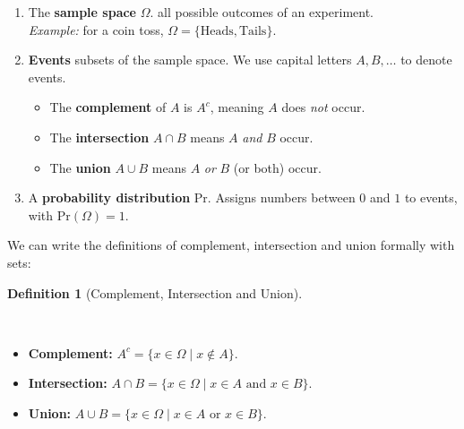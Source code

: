 \documentclass[
  letterpaper,
  DIV=11,
  numbers=noendperiod]{scrreprt}
\providecommand{\tightlist}{%
  \setlength{\itemsep}{0pt}\setlength{\parskip}{0pt}}
\theoremstyle{definition}
\theoremstyle{plain}
\theoremstyle{definition}
\newtheorem{definition}{Definition}[chapter]
\theoremstyle{remark}
\begin{document}
\begin{enumerate}
\def\labelenumi{\arabic{enumi}.}
\tightlist
\item
  The \textbf{sample space} \(\Omega\). all possible outcomes of an
  experiment.\\
  \emph{Example:} for a coin toss,
  \(\Omega = \{\text{Heads}, \text{Tails}\}\).\\
\item
  \textbf{Events} subsets of the sample space. We use capital letters
  \(A, B, \ldots\) to denote events.

  \begin{itemize}
  \tightlist
  \item
    The \textbf{complement} of \(A\) is \(A^c\), meaning \(A\) does
    \emph{not} occur.\\
  \item
    The \textbf{intersection} \(A \cap B\) means \(A\) \emph{and} \(B\)
    occur.\\
  \item
    The \textbf{union} \(A \cup B\) means \(A\) \emph{or} \(B\) (or
    both) occur.\\
  \end{itemize}
\item
  A \textbf{probability distribution} \(\mathrm{Pr}\). Assigns numbers
  between \(0\) and \(1\) to events, with \(\mathrm{Pr}(\Omega)=1\).
\end{enumerate}

We can write the definitions of complement, intersection and union
formally with sets:

\begin{definition}[Complement, Intersection and
Union]\protect\hypertarget{def-intersect-union}{}\label{def-intersect-union}

~

\begin{itemize}
\tightlist
\item
  \textbf{Complement:} \(A^c = \{x \in \Omega \mid x \notin A \}\).
\item
  \textbf{Intersection:}
  \(A\cap B = \{x \in \Omega \mid x \in A \text{ and } x \in B\}\).\\
\item
  \textbf{Union:}
  \(A\cup B = \{x \in \Omega \mid x \in A \text{ or } x \in B\}\).\\
\end{itemize}

\end{definition}
\end{document}
